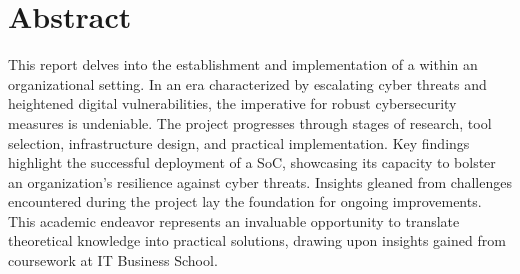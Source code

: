 \thispagestyle{plain} %
\section*{Abstract}
This report delves into the establishment and implementation of a  within an organizational setting.
In an era characterized by escalating cyber threats and heightened digital vulnerabilities, the imperative for robust cybersecurity measures is undeniable. The project progresses through stages of research, tool selection, infrastructure design, and practical implementation.
Key findings highlight the successful deployment of a SoC, showcasing its capacity to bolster an organization's resilience against cyber threats.
Insights gleaned from challenges encountered during the project lay the foundation for ongoing improvements.
This academic endeavor represents an invaluable opportunity to translate theoretical knowledge into practical solutions, drawing upon insights gained from coursework at IT Business School.

\newpage
